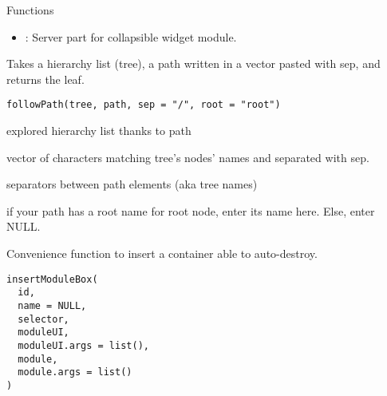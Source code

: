 \documentclass[letterpaper]{book}
\begin{document}
%
\begin{Section}{Functions}
\begin{itemize}

\item{} : Server part for collapsible widget module.

\end{itemize}
\end{Section}
%
\begin{Description}\relax
Takes a hierarchy list (tree), a path written in a vector pasted
with sep, and returns the leaf.
\end{Description}
%
\begin{Usage}
\begin{verbatim}
followPath(tree, path, sep = "/", root = "root")
\end{verbatim}
\end{Usage}
%
\begin{Arguments}
\begin{ldescription}
\item[\code{tree}] explored hierarchy list thanks to path

\item[\code{path}] vector of characters matching tree's nodes' names and
separated with sep.

\item[\code{sep}] separators between path elements (aka tree names)

\item[\code{root}] if your path has a root name for root node, enter its name here.
Else, enter NULL.
\end{ldescription}
\end{Arguments}
%
\begin{Description}\relax
Convenience function to insert a container able to auto-destroy.
\end{Description}
%
\begin{Usage}
\begin{verbatim}
insertModuleBox(
  id,
  name = NULL,
  selector,
  moduleUI,
  moduleUI.args = list(),
  module,
  module.args = list()
)
\end{verbatim}
\end{Usage}
%
\end{document}
